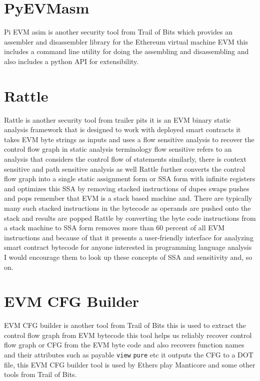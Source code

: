\section{PyEVMasm}

Pi EVM asim is another security tool from Trail of Bits which provides an assembler and disassembler library for the Ethereum virtual machine EVM this includes a command line utility for doing the assembling and disassembling and also includes a python API for extensibility.

\section{Rattle}

Rattle is another security tool from trailer pits it is an EVM binary static analysis framework that is designed to work with deployed smart contracts it takes EVM byte strings as inputs and uses a flow sensitive analysis to recover the control flow graph in static analysis terminology flow sensitive refers to an analysis that considers the control flow of statements similarly, there is context sensitive and path sensitive analysis as well Rattle further converts the control flow graph into a single static assignment form or SSA form with infinite registers and optimizes this SSA by removing stacked instructions of dupes swaps pushes and pops remember that EVM is a stack based machine and. There are typically many such stacked instructions in the bytecode as operands are pushed onto the stack and results are popped Rattle by converting the byte code instructions from a stack machine to SSA form removes more than 60 percent of all EVM instructions and because of that it presents a user-friendly interface for analyzing smart contract bytecode for anyone interested in programming language analysis I would encourage them to look up these concepts of SSA and sensitivity and, so on.

\section{EVM CFG Builder}

EVM CFG builder is another tool from Trail of Bits this is used to extract the control flow graph from EVM bytecode this tool helps us reliably recover control flow graph or CFG from the EVM byte code and also recovers function names and their attributes such as payable \verb|view| \verb|pure| etc it outputs the CFG to a DOT file, this EVM CFG builder tool is used by Ethers play Manticore and some other tools from Trail of Bits.

